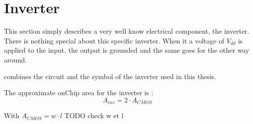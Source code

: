 \section{Inverter}
\label{sec:inv}

This section simply describes a very well know electrical component, the inverter. There is nothing special about this specific inverter. When it a voltage of $V_{dd}$ is applied to the input, the output is grounded and the same goes for the other way around.

\begin{figure}[H]
  \centering
  \hspace*{2.5cm}
  \hfill
  \hspace*{1.5cm}
  \caption{}
  \label{fig:inv}
\end{figure}

 combines the circuit and the symbol of the inverter used in this thesis.

The approximate onChip area for the inverter is :
\begin{equation}
  A_{inv}=2\cdot A_{CMOS}
\end{equation}

With $A_{CMOS}= w\cdot l$ TODO check w et l
